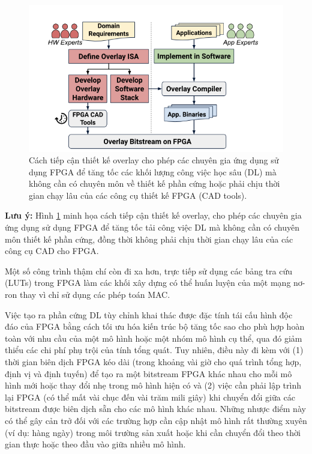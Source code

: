 \documentclass[a4paper]{article}
\begin{document}
    \begin{figure} [!h]
        \centering
        \includegraphics[width=0.75\linewidth]{assets/fpga_4.png}
        \caption{Cách tiếp cận thiết kế overlay cho phép các chuyên gia ứng dụng sử dụng FPGA để tăng tốc các khối lượng công việc học sâu (DL) mà không cần có chuyên môn về thiết kế phần cứng hoặc phải chịu thời gian chạy lâu của các công cụ thiết kế FPGA (CAD tools).}
        \label{fig:fpga_4}
    \end{figure}
    
    \textbf{Lưu ý:} Hình \ref{fig:fpga_4} minh họa cách tiếp cận thiết kế overlay, cho phép các chuyên gia ứng dụng sử dụng FPGA để tăng tốc tải công việc DL mà không cần có chuyên môn thiết kế phần cứng, đồng thời không phải chịu thời gian chạy lâu của các công cụ CAD cho FPGA.
    
    Một số công trình thậm chí còn đi xa hơn, trực tiếp sử dụng các bảng tra cứu (LUTs) trong FPGA làm các khối xây dựng có thể huấn luyện của một mạng nơ-ron thay vì chỉ sử dụng các phép toán MAC.
    
    Việc tạo ra phần cứng DL tùy chỉnh khai thác được đặc tính tái cấu hình độc đáo của FPGA bằng cách tối ưu hóa kiến trúc bộ tăng tốc sao cho phù hợp hoàn toàn với nhu cầu của một mô hình hoặc một nhóm mô hình cụ thể, qua đó giảm thiểu các chi phí phụ trội của tính tổng quát. Tuy nhiên, điều này đi kèm với (1) thời gian biên dịch FPGA kéo dài (trong khoảng vài giờ cho quá trình tổng hợp, định vị và định tuyến) để tạo ra một bitstream FPGA khác nhau cho mỗi mô hình mới hoặc thay đổi nhẹ trong mô hình hiện có và (2) việc cần phải lập trình lại FPGA (có thể mất vài chục đến vài trăm mili giây) khi chuyển đổi giữa các bitstream được biên dịch sẵn cho các mô hình khác nhau. Những nhược điểm này có thể gây cản trở đối với các trường hợp cần cập nhật mô hình rất thường xuyên (ví dụ: hàng ngày) trong môi trường sản xuất hoặc khi cần chuyển đổi theo thời gian thực hoặc theo đầu vào giữa nhiều mô hình.
    
\end{document}
